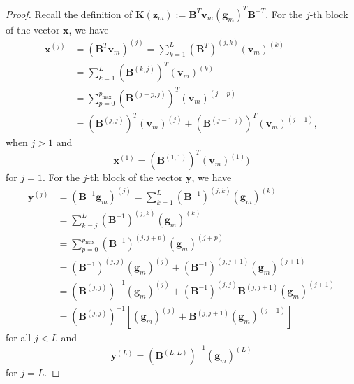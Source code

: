 \documentclass[a4paper, 11pt, oneside]{scrartcl}
\theoremstyle{break}
\newcommand{\matr}[1]{\boldsymbol{#1}}
\numberwithin{equation}{section}
\begin{document}
				\begin{proof}
					Recall the definition of $\matr{K}(\matr{z}_m) := \matr{B}^T \matr{v}_m (\matr{g}_m)^T \matr{B}^{-T}$. 
					For the $j$-th block of the vector $\matr{x}$, we have
					\begin{align*}
						\matr{x}^{(j)} &= (\matr{B}^T \matr{v}_m)^{(j)} = \sum_{k=1}^L (\matr{B}^T)^{(j, k)} (\matr{v}_m)^{(k)} \\
						&= \sum_{k=1}^L (\matr{B}^{(k, j)})^T (\matr{v}_m)^{(k)} \\
						&= \sum_{p=0}^{p_{\text{max}}} (\matr{B}^{(j-p, j)})^T (\matr{v}_m)^{(j-p)} \\
						&= (\matr{B}^{(j, j)})^T (\matr{v}_m)^{(j)} + (\matr{B}^{(j-1, j)})^T (\matr{v}_m)^{(j-1)},
					\end{align*}
					when $j > 1$
					and 
					\begin{equation*}
						\matr{x}^{(1)} = (\matr{B}^{(1, 1)})^T (\matr{v}_m)^{(1)})
					\end{equation*}
					for $j = 1$.
					For the $j$-th block of the vector $\matr{y}$, we have
					\begin{align*}
						\matr{y}^{(j)} &= (\matr{B}^{-1} \matr{g}_m)^{(j)} = \sum_{k=1}^L (\matr{B}^{-1})^{(j, k)} (\matr{g}_m)^{(k)} \\
						&= \sum_{k=j}^L (\matr{B}^{-1})^{(j, k)} (\matr{g}_m)^{(k)} \\
						&= \sum_{p=0}^{p_{\text{max}}} (\matr{B}^{-1})^{(j, j+p)} (\matr{g}_m)^{(j+p)} \\
						&= (\matr{B}^{-1})^{(j, j)} (\matr{g}_m)^{(j)} + (\matr{B}^{-1})^{(j, j+1)} (\matr{g}_m)^{(j+1)} \\
						&= (\matr{B}^{(j, j)})^{-1} (\matr{g}_m)^{(j)} + (\matr{B}^{-1})^{(j, j)} \matr{B}^{(j, j+1)} (\matr{g}_m)^{(j+1)} \\
						&= (\matr{B}^{(j, j)})^{-1} \left[ (\matr{g}_m)^{(j)} + \matr{B}^{(j, j+1)} (\matr{g}_m)^{(j+1)} \right]
					\end{align*}
					for all $j < L$ and 
					\begin{equation*}
						\matr{y}^{(L)} = (\matr{B}^{(L, L)})^{-1} (\matr{g}_m)^{(L)}
					\end{equation*}
					for $j = L$.
				\end{proof}
\end{document}
